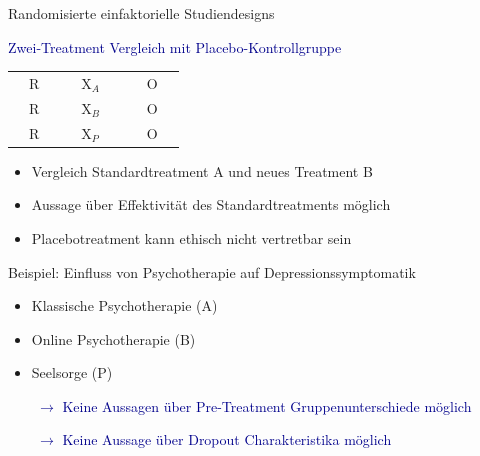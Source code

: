 \documentclass[
  8pt,
  ignorenonframetext,
]{beamer}
\providecommand{\tightlist}{%
  \setlength{\itemsep}{0pt}\setlength{\parskip}{0pt}}
\begin{document}
\begin{frame}{Randomisierte einfaktorielle Studiendesigns}
\protect\hypertarget{randomisierte-einfaktorielle-studiendesigns-4}{}
\large

\textcolor{darkblue}{Zwei-Treatment Vergleich mit Placebo-Kontrollgruppe}
\vspace{4mm}

\center
\begin{tabular}{|clc|}
\hline
$\quad$R$\quad$  & $\quad$X$_A$ $\quad$ & $\quad$O$\quad$
\\
$\quad$R$\quad$  & $\quad$X$_B$ $\quad$ & $\quad$O$\quad$
\\
$\quad$R$\quad$  & $\quad$X$_P$ $\quad$ & $\quad$O$\quad$
\\\hline
\end{tabular}
\vspace{2mm}

\normalsize

\begin{itemize}
\tightlist
\item
  Vergleich Standardtreatment A und neues Treatment B
\item
  Aussage über Effektivität des Standardtreatments möglich
\item
  Placebotreatment kann ethisch nicht vertretbar sein
\end{itemize}

\small
\flushleft

Beispiel: Einfluss von Psychotherapie auf Depressionssymptomatik

\begin{itemize}
\tightlist
\item
  Klassische Psychotherapie (A)
\item
  Online Psychotherapie (B)
\item
  Seelsorge (P)
\end{itemize}

\normalsize

\textcolor{darkblue}{$\quad\quad\rightarrow$ Keine Aussagen über Pre-Treatment Gruppenunterschiede möglich}

\textcolor{darkblue}{$\quad\quad\rightarrow$ Keine Aussage über Dropout Charakteristika möglich}
\end{frame}
\end{document}
